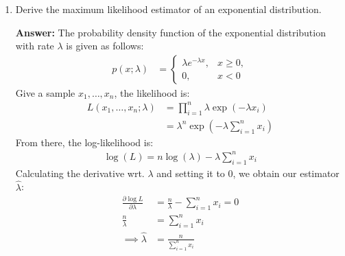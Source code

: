 \documentclass{article}
\newenvironment{QandA}{\begin{enumerate}[label=\arabic*.]}{\end{enumerate}}
\newenvironment{answer}{\par\normalfont \textbf{Answer:}}{}
\begin{document}
\begin{QandA}
    \item Derive the maximum likelihood estimator of an exponential distribution.
    \begin{answer}
        The probability density function of the exponential distribution with rate $\lambda$ is given as follows:
        \begin{align*}
            p(x; \lambda) &= \begin{cases}
                \lambda e^{-\lambda x}, & x \ge 0, \\
                0, & x < 0
            \end{cases}
        \end{align*}
    \end{answer}
    Give a sample $x_1, \ldots, x_n$, the likelihood is:
    \begin{align*}
        L(x_1, \ldots, x_n; \lambda) &= \prod_{i=1}^n \lambda \exp(-\lambda x_i) \\
        &= \lambda^n \exp \left( -\lambda \sum_{i=1}^n x_i \right)
    \end{align*}
    From there, the log-likelihood is:
    \begin{align*}
        \log (L) = n \log (\lambda) - \lambda \sum_{i=1}^n x_i
    \end{align*}
    Calculating the derivative wrt. $\lambda$ and setting it to $0$, we obtain our estimator $\hat{\lambda}$:
    \begin{align*}
        \frac{\partial \log L}{\partial \lambda} &= \frac{n}{\lambda} - \sum_{i=1}^n x_i = 0 \\
        \frac{n}{\lambda} &= \sum_{i=1}^n x_i \\
        \implies \hat{\lambda} &= \frac{n}{\sum_{i=1}^n x_i}
    \end{align*}
\end{QandA}
\end{document}
